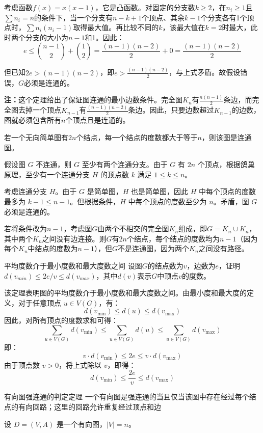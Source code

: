 \documentclass[lang=cn,11pt]{elegantbook}
\begin{document}
考虑函数$f(x) = x(x-1)$，它是凸函数。对固定的分支数$k\geqslant2$，在$n_i\geqslant1$且$\sum n_i=n$的条件下，当一个分支有$n-k+1$个顶点、其余$k-1$个分支各有1个顶点时，$\sum n_i(n_i-1)$取得最大值。再比较不同的$k$，该最大值在$k=2$时最大，此时两个分支的大小为$n-1$和1。因此：
\[
e \leqslant \binom{n-1}{2} + \binom{1}{2} = \frac{(n-1)(n-2)}{2} + 0 = \frac{(n-1)(n-2)}{2}
\]

但已知$2e > (n-1)(n-2)$，即$e > \frac{(n-1)(n-2)}{2}$，与上式矛盾。故假设错误，$G$必须是连通的。

\textbf{注：}这个定理给出了保证图连通的最小边数条件。完全图$K_n$有$\frac{n(n-1)}{2}$条边，而完全图去掉一个顶点$K_{n-1}$有$\frac{(n-1)(n-2)}{2}$条边。因此，只要边数超过$K_{n-1}$的边数，图就必须包含所有$n$个顶点且是连通的。
\begin{example}
    若一个无向简单图有$2n$个结点，每一个结点的度数都大于等于$n$，则该图是连通图。
\end{example}
假设图 $G$ 不连通，则 $G$ 至少有两个连通分支。由于 $G$ 有 $2n$ 个顶点，根据鸽巢原理，至少有一个连通分支 $H$ 的顶点数 $k$ 满足 $1 \leqslant k \leqslant n$。
    
考虑连通分支 $H$。由于 $G$ 是简单图，$H$ 也是简单图，因此 $H$ 中每个顶点的度数最多为 $k-1\leqslant n-1$。但根据条件，$H$ 中每个顶点的度数至少为 $n$。矛盾，图 $G$ 必须是连通的。

若将条件改为$n-1$，考虑图$G$由两个不相交的完全图$K_n$组成，即$G = K_n \cup K_n$，其中两个$K_n$之间没有边连接。则$G$有$2n$个结点，每个结点的度数均为$n-1$（因为每个$K_n$中结点的度数为$n-1$），但$G$不是连通图，因为两个$K_n$之间没有路径。
\begin{theorem}{平均度数介于最小度数和最大度数之间}
    设图$G$的结点数为$v$，边数为$e$，证明$d(v_{min})\leqslant 2e/v\leqslant d(v_{max})$，其中$d(v)$表示$G$中顶点$v$的度数。
\end{theorem}
该定理表明图的平均度数介于最小度数和最大度数之间。由最小度和最大度的定义，对于任意顶点 $u \in V(G)$，有：
    \[
    d(v_{\text{min}}) \leqslant d(u) \leqslant d(v_{\text{max}})
    \]
    因此，对所有顶点的度数求和可得：
    \[
    \sum_{u \in V(G)} d(v_{\text{min}}) \leqslant \sum_{u \in V(G)} d(u) \leqslant \sum_{u \in V(G)} d(v_{\text{max}})
    \]
    即：
    \[
    v \cdot d(v_{\text{min}}) \leqslant 2e \leqslant v \cdot d(v_{\text{max}})
    \]
    由于顶点数 $v > 0$，将上式除以 $v$，即得：
    \[
    d(v_{\text{min}}) \leqslant \frac{2e}{v} \leqslant d(v_{\text{max}})
    \]
\begin{theorem}{有向图强连通的判定定理}
    一个有向图是强连通的当且仅当该图中存在经过每个结点的有向回路；这里的回路允许重复经过顶点和边
\end{theorem}
设 $D = (V, A)$ 是一个有向图，$|V| = n$。
\end{document}
